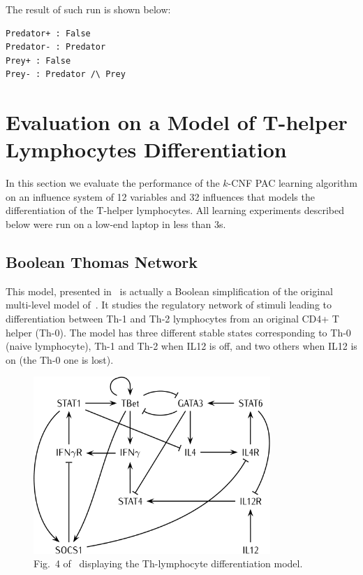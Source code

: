 \documentclass{llncs}
\begin{document}
The result of such run is shown below:
\begin{verbatim}
Predator+ : False
Predator- : Predator
Prey+ : False
Prey- : Predator /\ Prey
\end{verbatim}

\section{Evaluation on a Model of T-helper Lymphocytes Differentiation}\label{ex:lympho}


In this section we evaluate the performance of the $k$-CNF PAC learning
algorithm on an influence system of 12 variables and 32 influences that models
the differentiation of the T-helper lymphocytes.
All learning experiments described below were run on a
low-end laptop in less than 3s.

\subsection{Boolean Thomas Network}

This model, presented in~\cite{RRMTC06tcsb} is actually a Boolean
simplification of the original multi-level model
of~\cite{Mendoza06biosystems}. It studies the regulatory network of stimuli
leading to differentiation between Th-1 and Th-2 lymphocytes from an original
CD4+ T helper (Th-0).
The model has three different stable states corresponding to Th-0 (naive
lymphocyte), Th-1 and Th-2 when IL12 is off, and two others when IL12 is on
(the Th-0 one is lost).

\begin{figure}[htbp]
   \centering
   \includegraphics[width=0.8\textwidth]{th_net_clean.png}
   \caption{Fig.~4 of~\cite{RRMTC06tcsb} displaying the Th-lymphocyte
   differentiation model.\label{fig:lympho}}
\end{figure}
\end{document}
